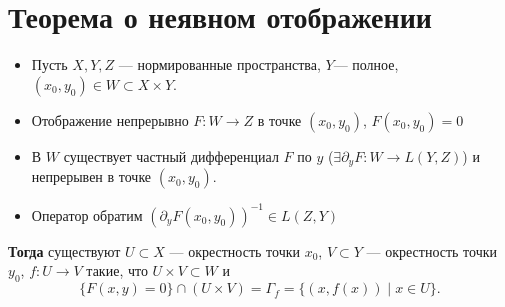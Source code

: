 \section{Теорема о неявном отображении}
\begin{thm} \label{thm:implicit-display}
    \begin{itemize}[noitemsep]
	\item Пусть $ X, Y, Z$ --- нормированные пространства,   $ Y$--- полное, $ (x_0, y_0) \in W \subset X \times Y$.
	\item Отображение непрерывно $ F \colon W \to  Z$ в точке $ (x_0, y_0)$, $ F(x_0, y_0) = 0$
	\item В $ W$ существует частный дифференциал  $ F$ по  $ y$ ($ \exists  \partial _y F \colon W \to  L(Y, Z)$) и непрерывен в точке $ (x_0, y_0)$.
	\item  Оператор обратим $ (\partial _yF(x_0, y_0) )^{-1} \in  L(Z, Y)$
    \end{itemize}
	{\bf Тогда} существуют $ U \subset X$ --- окрестность точки $ x_0$, $ V \subset Y$ --- окрестность точки $ y_0$, $ f\colon U \to  V$ такие, что $ U \times V \subset W$ и
    \[
	\{F(x, y) = 0\} \cap (U \times V) = \Gamma _f = \{(x, f(x)) \mid x \in U\}
    .\] 
\end{thm}
